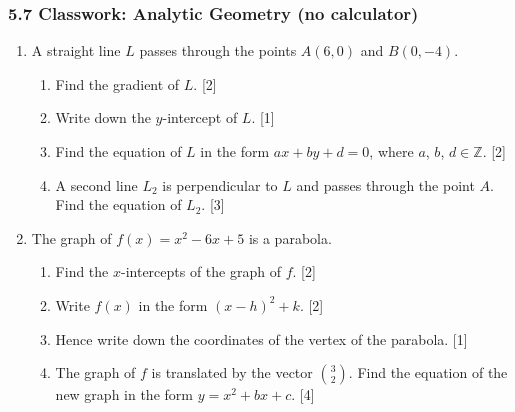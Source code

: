 \documentclass[12pt, twoside]{article}
\begin{document}
\subsubsection*{5.7 Classwork: Analytic Geometry (no calculator)}

\begin{enumerate}[itemsep=0.2cm]

\item A straight line $L$ passes through the points $A(6, 0)$ and $B(0, -4)$.

\begin{enumerate}[itemsep=0.15cm]
  \item Find the gradient of $L$. \hfill [2]
  \item Write down the $y$-intercept of $L$. \hfill [1]
  \item Find the equation of $L$ in the form $ax + by + d = 0$,
        where $a$, $b$, $d \in \mathbb{Z}$. \hfill [2]
  \item A second line $L_2$ is perpendicular to $L$ and passes through the
        point $A$. Find the equation of $L_2$. \hfill [3]
\end{enumerate}


\newpage

\item The graph of $f(x) = x^2 - 6x + 5$ is a parabola.

\begin{enumerate}[itemsep=0.15cm]
  \item Find the $x$-intercepts of the graph of $f$. \hfill [2]
  \item Write $f(x)$ in the form $(x - h)^2 + k$. \hfill [2]
  \item Hence write down the coordinates of the vertex of the parabola. \hfill [1]
  \item The graph of $f$ is translated by the vector $\displaystyle\binom{3}{2}$.
        Find the equation of the new graph in the form $y = x^2 + bx + c$. \hfill [4]
\end{enumerate}



\end{enumerate}
\end{document}
